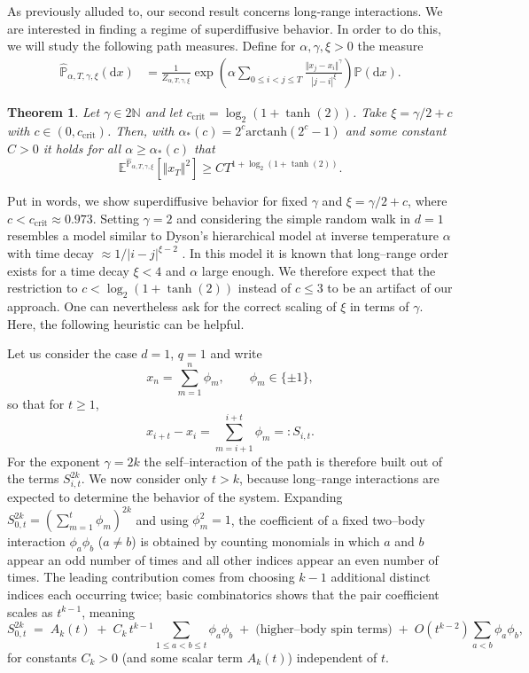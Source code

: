 \documentclass[reqno,11pt]{amsart}
\newcommand{\1}{\mathds{1}}
\theoremstyle{plain}
\newtheorem{theorem}{Theorem}[section]
\theoremstyle{definition}
\numberwithin{equation}{section}
\newcommand{\bbE}{{\mathbb E}}
\newcommand{\bbN}{{\mathbb N}}
\newcommand{\bbP}{{\mathbb P}}
\newcommand{\de}{{\mathrm{d}}}
\newcommand{\bbPh}{\hat{\bbP}}
\def\lt{\left}
\def\rt{\right}
\begin{document}
As previously alluded to, our second result concerns long-range interactions. We are interested in finding a regime of superdiffusive behavior. In order to do this, we will study the following path measures.
Define for $\alpha,\gamma,\xi > 0$ the measure
\begin{equation}
    \label{equ:long_range_rw}
    \begin{split}
        \hat{\bbP}_{\alpha,T,\gamma,\xi}(\de x) &=  \frac{1}{Z_{\alpha,T,\gamma,\xi}} \exp \lt( \alpha \sum\limits_{0 \le i< j \le T} \frac{ \Vert x_j - x_i \Vert^\gamma}{|j-i|^{\xi}} \rt) \bbP(\de x) .
    \end{split}
\end{equation}

\begin{theorem}
    \label{thm:long_range_superdiffusive_behavior}
    Let $\gamma \in 2\bbN$ and let $c_{\mathrm{crit}}= \log_2(1+\tanh(2))$. Take $\xi = \gamma/2 + c$ with $c \in (0,c_{\mathrm{crit}})$. Then, with $\alpha_* (c) = 2^c \mathrm{arctanh}(2^c - 1)$ and some constant $C>0$ it holds
    for all $\alpha \ge \alpha_* (c)$ that
    $$\bbE^{\bbPh_{\alpha,T,\gamma,\xi}}[ \Vert x_T \Vert ^2] \ge C T^{1+ \log_2(1+ \tanh(2))}.$$
\end{theorem}
Put in words, we show superdiffusive behavior for fixed $\gamma$ and $\xi = \gamma/2 + c$, where $c <c_{\mathrm{crit}}\approx 0.973$. Setting $\gamma =2$ and considering the simple random walk in $d=1$ resembles a model similar to Dyson's hierarchical model at inverse temperature $\alpha$ with time decay $\approx 1/ |i-j|^{\xi-2}$ \cite{Dyson1969,PrSaSc08}. In this model it is known that long--range order exists for a time decay $\xi < 4$ and $\alpha$ large enough. We therefore expect that the restriction to $c < \log_2 ( 1+\tanh(2))$ instead of $c \le 3$ to be an artifact of our approach. One can nevertheless ask for the correct scaling of $\xi$ in terms of $\gamma$. Here, the following heuristic can be helpful.

Let us consider the case $d=1$, $q=1$ and write
\[
    x_n=\sum_{m=1}^n \phi_m,\qquad \phi_m\in\{\pm1\},
\]
so that for  $t\ge1$,
\[
    x_{i+t}-x_i = \sum_{m=i+1}^{i+t}\phi_m =: S_{i,t}.
\]
For the exponent $\gamma=2k$ the self--interaction of the path is therefore built out of the terms $S_{i,t}^{2k}$. We now consider only $t > k$, because long--range interactions are expected to determine the behavior of the system.
Expanding $S_{0,t}^{2k}=(\sum_{m=1}^t \phi_m)^{2k}$ and using $\phi_m^2=1$, the coefficient of a fixed two--body interaction $\phi_a\phi_b$ ($a\neq b$) is obtained by counting monomials in which $a$ and $b$ appear an odd number of times and all other indices appear an even number of times.  The leading contribution comes from choosing $k-1$ additional distinct indices each occurring twice; basic combinatorics
shows that the pair coefficient scales as $t^{k-1}$, meaning
\begin{equation}
    \label{eq:pair-coeff-heuristic}
    S_{0,t}^{2k}
    \;=\; A_k(t)
    \;+\; C_k\, t^{k-1}\!\sum_{1\le a<b\le t}\phi_a\phi_b
    \;+\; \text{(higher--body spin terms)}
    \;+\; O(t^{k-2})\!\sum_{a<b}\phi_a\phi_b,
\end{equation}
for constants $C_k>0$ (and some scalar term $A_k(t)$) independent of $t$.
\end{document}
